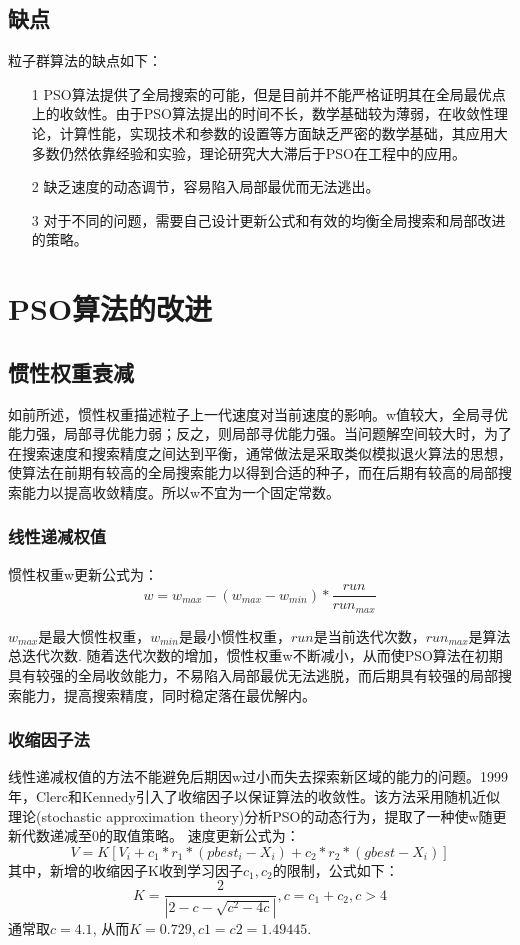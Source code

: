 \documentclass[8pt]{article}
\begin{document}
\subsection{缺点}
粒子群算法的缺点如下：
\begin{itemize}[leftmargin=4em]
	\setlength{\itemsep}{0pt}
	\setlength{\parsep}{0pt}
	\setlength{\parskip}{0pt}
	\item[1] PSO算法提供了全局搜索的可能，但是目前并不能严格证明其在全局最优点上的收敛性。由于PSO算法提出的时间不长，数学基础较为薄弱，在收敛性理论，计算性能，实现技术和参数的设置等方面缺乏严密的数学基础，其应用大多数仍然依靠经验和实验，理论研究大大滞后于PSO在工程中的应用。
	\item[2] 缺乏速度的动态调节，容易陷入局部最优而无法逃出。
	\item[3] 对于不同的问题，需要自己设计更新公式和有效的均衡全局搜索和局部改进的策略。
\end{itemize}

\section{PSO算法的改进}
\subsection{惯性权重衰减}
如前所述，惯性权重描述粒子上一代速度对当前速度的影响。w值较大，全局寻优能力强，局部寻优能力弱；反之，则局部寻优能力强。当问题解空间较大时，为了在搜索速度和搜索精度之间达到平衡，通常做法是采取类似模拟退火算法的思想，使算法在前期有较高的全局搜索能力以得到合适的种子，而在后期有较高的局部搜索能力以提高收敛精度。所以w不宜为一个固定常数。
\subsubsection{线性递减权值}
惯性权重w更新公式为：
\begin{equation}
	w = w_{max} - (w_{max} - w_{min}) * \frac{run}{run_{max}}
\end{equation}
\par
$w_{max}$是最大惯性权重，$w_{min}$是最小惯性权重，$run$是当前迭代次数，$run_{max}$是算法总迭代次数. 随着迭代次数的增加，惯性权重w不断减小，从而使PSO算法在初期具有较强的全局收敛能力，不易陷入局部最优无法逃脱，而后期具有较强的局部搜索能力，提高搜索精度，同时稳定落在最优解内。
\subsubsection{收缩因子法}
线性递减权值的方法不能避免后期因w过小而失去探索新区域的能力的问题。1999年，Clerc和Kennedy引入了收缩因子以保证算法的收敛性。该方法采用随机近似理论(stochastic approximation theory)分析PSO的动态行为，提取了一种使w随更新代数递减至0的取值策略。
速度更新公式为：
\begin{equation}
	V = K[V_i + c_1 * r_1 *(pbest_i - X_i) + c_2 * r_2 *(gbest - X_i)]
\end{equation}
其中，新增的收缩因子K收到学习因子$c_1,c_2$的限制，公式如下：
\begin{equation}
	K = \frac{2}{|2 - c - \sqrt{c^2 - 4c}|}, c = c_1 + c_2, c > 4
\end{equation}
通常取$c=4.1$, 从而$K=0.729, c1=c2=1.49445$.
\end{document}
